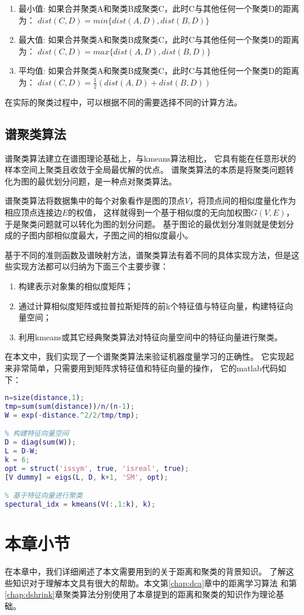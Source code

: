 \begin{enumerate}
    \item 最小值: 如果合并聚类A和聚类B成聚类C，此时C与其他任何一个聚类D的距离为：
        $dist(C, D) = min\{dist(A, D), dist(B, D)\}$
    \item 最大值: 如果合并聚类A和聚类B成聚类C，此时C与其他任何一个聚类D的距离为：
        $dist(C, D) = max\{dist(A, D), dist(B, D)\}$
    \item 平均值: 如果合并聚类A和聚类B成聚类C，此时C与其他任何一个聚类D的距离为：
        $dist(C, D) = \frac{1}{2}(dist(A, D) + dist(B, D))$
\end{enumerate}

在实际的聚类过程中，可以根据不同的需要选择不同的计算方法。

\subsection{谱聚类算法}

谱聚类算法建立在谱图理论基础上，与kmeans算法相比，
它具有能在任意形状的样本空间上聚类且收敛于全局最优解的优点。
谱聚类算法的本质是将聚类问题转化为图的最优划分问题，是一种点对聚类算法。

谱聚类算法将数据集中的每个对象看作是图的顶点$V$，将顶点间的相似度量化作为相应顶点连接边$E$的权值，
这样就得到一个基于相似度的无向加权图$G(V, E)$，于是聚类问题就可以转化为图的划分问题。
基于图论的最优划分准则就是使划分成的子图内部相似度最大，子图之间的相似度最小。

基于不同的准则函数及谱映射方法，谱聚类算法有着不同的具体实现方法，但是这些实现方法都可以归纳为下面三个主要步骤：

\begin{enumerate}
    \item 构建表示对象集的相似度矩阵；
    \item 通过计算相似度矩阵或拉普拉斯矩阵的前k个特征值与特征向量，构建特征向量空间；
    \item 利用kmeans或其它经典聚类算法对特征向量空间中的特征向量进行聚类。
\end{enumerate}

在本文中，我们实现了一个谱聚类算法来验证机器度量学习的正确性。
它实现起来非常简单，只需要用到矩阵求特征值和特征向量的操作，
它的matlab代码如下：

\begin{lstlisting}[language={matlab}, caption={谱聚类算法的简单实现}]
% 将距离矩阵转换为相似度矩阵
n=size(distance,1);
tmp=sum(sum(distance))/n/(n-1);
W = exp(-distance.^2/2/tmp/tmp);

% 构建特征向量空间
D = diag(sum(W));
L = D-W;
k = 6;
opt = struct('issym', true, 'isreal', true);
[V dummy] = eigs(L, D, k+1, 'SM', opt);

% 基于特征向量进行聚类
spectural_idx = kmeans(V(:,1:k), k);

\end{lstlisting}


\section{本章小节}

在本章中，我们详细阐述了本文需要用到的关于距离和聚类的背景知识。
了解这些知识对于理解本文具有很大的帮助。本文第\ref{chap:dca}章中的距离学习算法
和第\ref{chap:dshrink}章聚类算法分别使用了本章提到的距离和聚类的知识作为理论基础。
